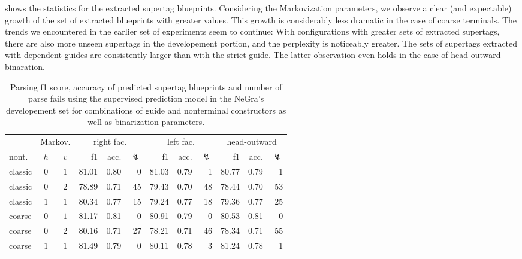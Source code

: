 \documentclass[../../document.tex]{subfiles}
\begin{document}
     shows the statistics for the extracted supertag blueprints.
    Considering the Markovization parameters, we observe a clear (and expectable) growth of the set of extracted blueprints with greater values.
    This growth is considerably less dramatic in the case of coarse terminals.
    The trends we encountered in the earlier set of experiments seem to continue:
        With configurations with greater sets of extracted supertags, there are also more unseen supertags in the developement portion, and the perplexity is noticeably greater.
        The sets of supertags extracted with dependent guides are consistently larger than with the strict guide.
    The latter observation even holds in the case of head-outward binaration.


    \begin{table}
        \caption{\label{tbl:gridsearch:2:2}
        Parsing f1 score, accuracy of predicted supertag blueprints and number of parse fails using the supervised prediction model in the NeGra's developement set for combinations of guide and nonterminal constructors as well as binarization parameters.
        }
        \centering
        \vspace{.2cm}
        \begin{tabular}{lcc|rrr|rrr|rrr}
            \toprule
& \multicolumn{2}{c|}{Markov.}         & \multicolumn{3}{c|}{right fac.} & \multicolumn{3}{c|}{left fac.} & \multicolumn{3}{c}{head-outward} \\
nont.  & \(h\) &\(v\) & f1 & acc. & $\lightning$ & f1 & acc. & $\lightning$ & f1 & acc. & $\lightning$   \\ \hline
classic & \(0\) & \(1\) & 81.01 & 0.80 & 0 & 81.03 & 0.79 & 1 & 80.77 & 0.79 & 1 \\  
classic & \(0\) & \(2\) & 78.89 & 0.71 & 45 & 79.43 & 0.70 & 48 & 78.44 & 0.70 & 53 \\  
classic & \(1\) & \(1\) & 80.34 & 0.77 & 15 & 79.24 & 0.77 & 18 & 79.36 & 0.77 & 25 \\ \hline
coarse  & \(0\) & \(1\) & 81.17 & 0.81 & 0 & 80.91 & 0.79 & 0 & 80.53 & 0.81 & 0 \\  
coarse  & \(0\) & \(2\) & 80.16 & 0.71 & 27 & 78.21 & 0.71 & 46 & 78.34 & 0.71 & 55 \\ 
coarse  & \(1\) & \(1\) & 81.49 & 0.79 & 0 & 80.11 & 0.78 & 3 & 81.24 & 0.78 & 1 \\  
\bottomrule
        \end{tabular}
    \end{table}
\end{document}
